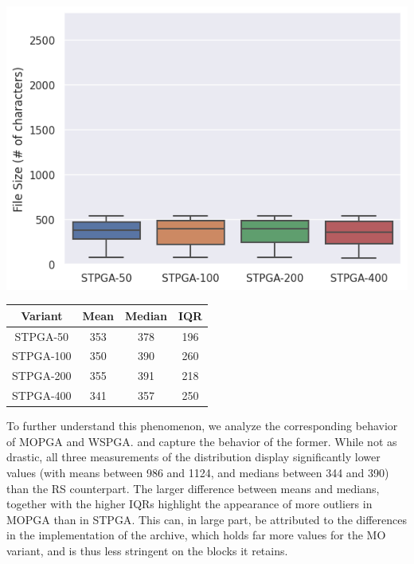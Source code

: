 \begin{minipage}{\textwidth}
\vspace{0.25cm}
  \begin{minipage}[b]{0.49\textwidth}
    \centering
    \includegraphics[scale=0.4]{img/rq1-3/rq1-3-size-dist1.png}
    \label{fig:rq1-3size-dist1}
  \end{minipage}
  \hfill
  \begin{minipage}[b]{0.49\textwidth}
    \centering
\begin{tabular}{c|ccc}
    Variant & Mean & Median & \gls{IQR}\\
    \midrule
    \gls{STPGA}-50 & 353 & 378 & 196\\
    \gls{STPGA}-100 & 350 & 390 & 260\\
    \gls{STPGA}-200 & 355 & 391 & 218\\
    \gls{STPGA}-400 & 341 & 357 & 250\\
\end{tabular}
\vfill
  \label{tab:rq1-3size-dist1}
\end{minipage}
\vspace{0.25cm}
\end{minipage}

To further understand this phenomenon, we analyze the corresponding behavior
of \gls{MOPGA} and \gls{WSPGA}.
 and  capture the behavior of the former.
While not as drastic, all three measurements of the distribution display significantly lower
values (with means between 986 and 1124, and medians between 344 and 390)
than the \gls{RS} counterpart.
The larger difference between means and medians, together with the
higher \gls{IQR}s highlight the appearance of more outliers in \gls{MOPGA}
than in \gls{STPGA}.
This can, in large part, be attributed to the differences in the implementation
of the archive, which holds far more values for the \gls{MO} variant, and
is thus less stringent on the blocks it retains.

